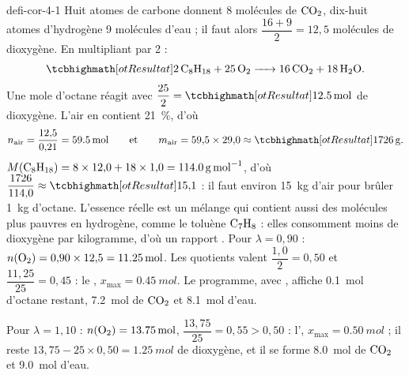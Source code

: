 \begin{blocEdition}{defi-cor-4-1}
Huit atomes de carbone donnent 8 molécules de $\ce{CO2}$, dix-huit atomes d'hydrogène 9 molécules d'eau ; il faut alors
$\dfrac{16+9}{2}=12{,}5$ molécules de dioxygène. En multipliant par 2 :
\[\res{\ce{2C8H18 + 25O2 -> 16CO2 + 18H2O}}.\]
Une mole d'octane réagit avec $\dfrac{25}{2}=\res{\qty{12,5}{mol}}$ de dioxygène. L'air en contient 21~\%, d'où
\[n_\text{air}=\frac{12{,}5}{0{,}21}=\qty{59,5}{mol}\qquad\text{et}\qquad m_\text{air}=59{,}5\times29{,}0\approx\res{\qty{1726}{g}}.\]
$M(\ce{C8H18})=8\times12{,}0+18\times1{,}0=\qty{114,0}{g.mol^{-1}}$, d'où $\dfrac{1726}{114{,}0}\approx\res{15{,}1}$ : il faut environ \qty{15}{kg} d'air pour brûler
\qty{1}{kg} d'octane. L'essence réelle est un mélange qui contient aussi des molécules plus pauvres en hydrogène,
comme le toluène $\ce{C7H8}$ : elles consomment moins de dioxygène par kilogramme, d'où un rapport .
Pour $\lambda=0{,}90$ : $n(\ce{O2})=0{,}90\times12{,}5=\qty{11,25}{mol}$. Les quotients valent $\dfrac{1{,}0}{2}=0{,}50$ et $\dfrac{11{,}25}{25}=0{,}45$ : le
, $x_\mathrm{max}=\qty{0,45}{mol}$. Le programme, avec ,
affiche \qty{0,1}{mol} d'octane restant, \qty{7,2}{mol} de $\ce{CO2}$ et \qty{8,1}{mol} d'eau.\par\smallskip
Pour $\lambda=1{,}10$ : $n(\ce{O2})=\qty{13,75}{mol}$, $\dfrac{13{,}75}{25}=0{,}55>0{,}50$ : l', $x_\mathrm{max}=\qty{0,50}{mol}$ ; il reste
$13{,}75-25\times0{,}50=\qty{1,25}{mol}$ de dioxygène, et il se forme \qty{8,0}{mol} de $\ce{CO2}$ et \qty{9,0}{mol} d'eau.
\end{blocEdition}

